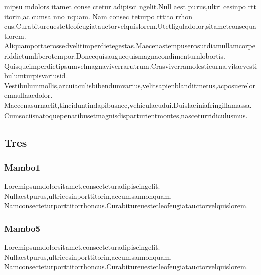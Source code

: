 \documentclass[../main.tex]{subfiles}
\begin{document}
\noindent

mipsu mdolors itamet \parencite{trelloUsers} conse ctetur adipisci ngelit.Null aest purus,ultri cesinpo rtt itorin,ac cumsa nno nquam.
Nam consec teturpo rttito rrhon cus.Curabitureuestetleofeugiatauctorvelquislorem.Utetliguladolor,sitametconsequatlorem.
Aliquamportaerossedvelitimperdietegestas.Maecenastempuserosutdiamullamcorperiddictumliberotempor.Donecquisauguequismagnacondimentumlobortis.
Quisqueimperdietipsumvelmagnaviverrarutrum.Crasviverramolestieurna,vitaevestibulumturpisvariusid.
Vestibulummollis,arcuiaculisbibendumvarius,velitsapienblanditmetus,acposuereloremnullaacdolor.
Maecenasurnaelit,tinciduntindapibusnec,vehiculaeudui.Duislaciniafringillamassa.
Cumsociisnatoquepenatibusetmagnisdisparturientmontes,nasceturridiculusmus.

\subsection{Tres}
    \subsubsection{Mambo1}
        Loremipsumdolorsitamet,consecteturadipiscingelit.
        Nullaestpurus,ultricesinporttitorin,accumsannonquam.
        Namconsecteturporttitorrhoncus.Curabitureuestetleofeugiatauctorvelquislorem.
    
    \subsubsection{Mambo5}
        Loremipsumdolorsitamet,consecteturadipiscingelit.
        Nullaestpurus,ultricesinporttitorin,accumsannonquam.
        Namconsecteturporttitorrhoncus.Curabitureuestetleofeugiatauctorvelquislorem.

\end{document}
